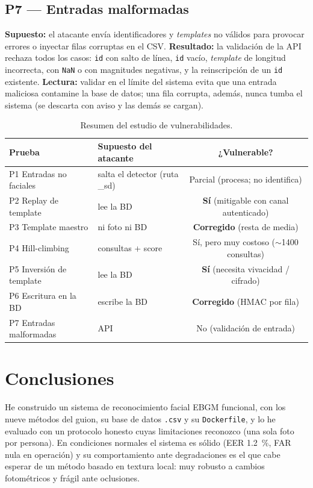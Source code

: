 \documentclass[11pt,a4paper]{article}
\begin{document}
\subsection{P7 --- Entradas malformadas}
\textbf{Supuesto:} el atacante envía identificadores y \emph{templates} no válidos para
provocar errores o inyectar filas corruptas en el CSV. \textbf{Resultado:} la validación de la
API rechaza todos los casos: \texttt{id} con salto de línea, \texttt{id} vacío, \emph{template}
de longitud incorrecta, con \texttt{NaN} o con magnitudes negativas, y la reinscripción de un
\texttt{id} existente. \textbf{Lectura:} validar en el límite del sistema evita que una entrada
maliciosa contamine la base de datos; una fila corrupta, además, nunca tumba el sistema (se
descarta con aviso y las demás se cargan).

\begin{table}[h]
\centering\small
\begin{tabular}{@{}llc@{}}
\toprule
\textbf{Prueba} & \textbf{Supuesto del atacante} & \textbf{¿Vulnerable?} \\
\midrule
P1 Entradas no faciales & salta el detector (ruta \_sd) & Parcial (procesa; no identifica) \\
P2 Replay de template & lee la BD & \textbf{Sí} (mitigable con canal autenticado) \\
P3 Template maestro & ni foto ni BD & \textbf{Corregido} (resta de media) \\
P4 Hill-climbing & consultas + score & Sí, pero muy costoso ($\sim$1400 consultas) \\
P5 Inversión de template & lee la BD & \textbf{Sí} (necesita vivacidad / cifrado) \\
P6 Escritura en la BD & escribe la BD & \textbf{Corregido} (HMAC por fila) \\
P7 Entradas malformadas & API & No (validación de entrada) \\
\bottomrule
\end{tabular}
\caption{Resumen del estudio de vulnerabilidades.}
\label{tab:ataques}
\end{table}

\section{Conclusiones}

He construido un sistema de reconocimiento facial EBGM funcional, con los nueve métodos del
guion, su base de datos \texttt{.csv} y su \texttt{Dockerfile}, y lo he evaluado con un
protocolo honesto cuyas limitaciones reconozco (una sola foto por persona). En condiciones
normales el sistema es sólido (EER \SI{1.2}{\percent}, FAR nula en operación) y su
comportamiento ante degradaciones es el que cabe esperar de un método basado en textura local:
muy robusto a cambios fotométricos y frágil ante oclusiones.
\end{document}
